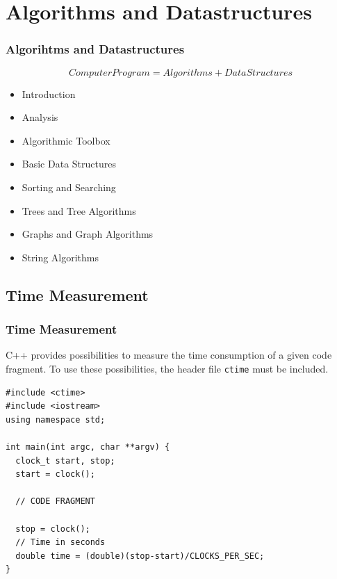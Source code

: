 \section{Algorithms and Datastructures}
\begin{frame}[fragile]
\frametitle{Algorihtms and Datastructures}
\begin{displaymath}
Computer Program = Algorithms + Data Structures
\end{displaymath}
\begin{itemize}
\item Introduction
\item Analysis
\item Algorithmic Toolbox
\item Basic Data Structures
\item Sorting and Searching
\item Trees and Tree Algorithms
\item Graphs and Graph Algorithms
\item String Algorithms
\end{itemize}
\end{frame}

\subsection{Time Measurement}
\begin{frame}[fragile]
\frametitle{Time Measurement}
C++ provides possibilities to measure the time consumption of a given
code fragment. To use these possibilities, the header file \verb|ctime|
must be included.

{\tiny
\begin{lstlisting}
#include <ctime>
#include <iostream>
using namespace std;

int main(int argc, char **argv) {
  clock_t start, stop;
  start = clock();
  
  // CODE FRAGMENT
  
  stop = clock();
  // Time in seconds
  double time = (double)(stop-start)/CLOCKS_PER_SEC;
}
\end{lstlisting}
}
\end{frame}

